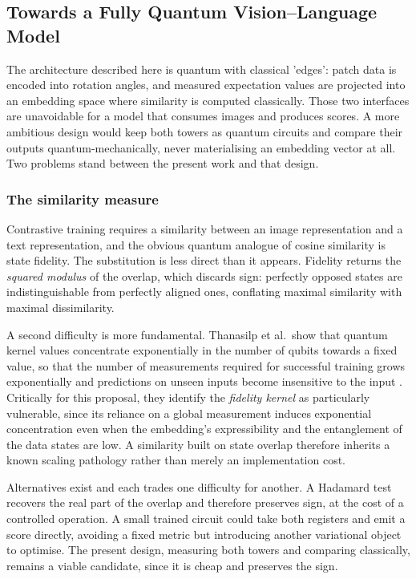\documentclass[12pt, a4paper, oneside]{report}
\begin{document}
\subsection{Towards a Fully Quantum Vision--Language Model}

The architecture described here is quantum with classical 'edges': patch data is encoded into rotation angles, and measured expectation values are projected into an embedding space where similarity is computed classically. Those two interfaces are unavoidable for a model that consumes images and produces scores. A more ambitious design would keep both towers as quantum circuits and compare their outputs quantum-mechanically, never materialising an embedding vector at all. Two problems stand between the present work and that design.

\subsubsection{The similarity measure}
Contrastive training requires a similarity between an image representation and a text representation, and the obvious quantum analogue of cosine similarity is state fidelity. The substitution is less direct than it appears. Fidelity returns the \emph{squared modulus} of the overlap, which discards sign: perfectly opposed states are indistinguishable from perfectly aligned ones, conflating maximal similarity with maximal dissimilarity.

A second difficulty is more fundamental. Thanasilp et al.\ show that quantum kernel values concentrate exponentially in the number of qubits towards a fixed value, so that the number of measurements required for successful training grows exponentially and predictions on unseen inputs become insensitive to the input \cite{thanasilp2024concentration}. Critically for this proposal, they identify the \emph{fidelity kernel} as particularly vulnerable, since its reliance on a global measurement induces exponential concentration even when the embedding's expressibility and the entanglement of the data states are low. A similarity built on state overlap therefore inherits a known scaling pathology rather than merely an implementation cost.

Alternatives exist and each trades one difficulty for another. A Hadamard test recovers the real part of the overlap and therefore preserves sign, at the cost of a controlled operation. A small trained circuit could take both registers and emit a score directly, avoiding a fixed metric but introducing another variational object to optimise. The present design, measuring both towers and comparing classically, remains a viable candidate, since it is cheap and preserves the sign.
\end{document}

